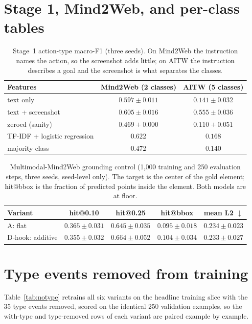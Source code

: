 \documentclass{article}
\makeatletter
\newcommand{\hitat}[1]{hit@#1}
\makeatother
\begin{document}
\section{Stage 1, Mind2Web, and per-class tables}
\label{app:tables}

\begin{table}[h]
\centering
\small
\caption{Stage~1 action-type macro-F1 (three seeds). On Mind2Web the instruction names the action, so the screenshot adds little; on AITW the instruction describes a goal and the screenshot is what separates the classes.}
\label{tab:stage1}
\begin{tabular}{lcc}
\toprule
Features & Mind2Web (2 classes) & AITW (5 classes) \\
\midrule
text only & $0.597 \pm 0.011$ & $0.141 \pm 0.032$ \\
text + screenshot & $0.605 \pm 0.016$ & $0.555 \pm 0.036$ \\
zeroed (sanity) & $0.469 \pm 0.000$ & $0.110 \pm 0.051$ \\
\midrule
TF-IDF + logistic regression & $0.622$ & $0.168$ \\
majority class & $0.472$ & $0.140$ \\
\bottomrule
\end{tabular}
\end{table}

\begin{table}[h]
\centering
\small
\caption{Multimodal-Mind2Web grounding control (1,000 training and 250 evaluation steps, three seeds, seed-level only). The target is the center of the gold element; hit@bbox is the fraction of predicted points inside the element. Both models are at floor.}
\label{tab:m2w}
\begin{tabular}{lcccc}
\toprule
Variant & \hitat{0.10} & \hitat{0.25} & hit@bbox & mean L2 $\downarrow$ \\
\midrule
A: flat & $0.365 \pm 0.031$ & $0.645 \pm 0.035$ & $0.095 \pm 0.018$ & $0.234 \pm 0.023$ \\
D-hook: additive & $0.355 \pm 0.032$ & $0.664 \pm 0.052$ & $0.104 \pm 0.034$ & $0.233 \pm 0.027$ \\
\bottomrule
\end{tabular}
\end{table}
\FloatBarrier

\section{Type events removed from training}
\label{app:notype}
Table~\ref{tab:notype} retrains all six variants on the headline training slice with the 35 type events removed, scored on the identical 250 validation examples, so the with-type and type-removed rows of each variant are paired example by example.

\FloatBarrier
\end{document}
